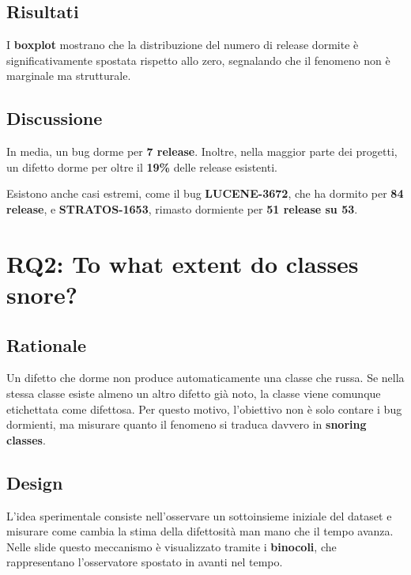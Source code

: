 \subsection{Risultati}

I \textbf{boxplot} mostrano che la distribuzione del numero di release dormite è significativamente spostata rispetto allo zero, segnalando che il fenomeno non è marginale ma strutturale.

\subsection{Discussione}

In media, un bug dorme per \textbf{7 release}. Inoltre, nella maggior parte dei progetti, un difetto dorme per oltre il \textbf{19\%} delle release esistenti.

\begin{notaslide}
Esistono anche casi estremi, come il bug \textbf{LUCENE-3672}, che ha dormito per \textbf{84 release}, e \textbf{STRATOS-1653}, rimasto dormiente per \textbf{51 release su 53}.
\end{notaslide}

\section{RQ2: To what extent do classes snore?}

\subsection{Rationale}

Un difetto che dorme non produce automaticamente una classe che russa. Se nella stessa classe esiste almeno un altro difetto già noto, la classe viene comunque etichettata come difettosa. Per questo motivo, l'obiettivo non è solo contare i bug dormienti, ma misurare quanto il fenomeno si traduca davvero in \textbf{snoring classes}.

\subsection{Design}

L'idea sperimentale consiste nell'osservare un sottoinsieme iniziale del dataset e misurare come cambia la stima della difettosità man mano che il tempo avanza. Nelle slide questo meccanismo è visualizzato tramite i \textbf{binocoli}, che rappresentano l'osservatore spostato in avanti nel tempo.

